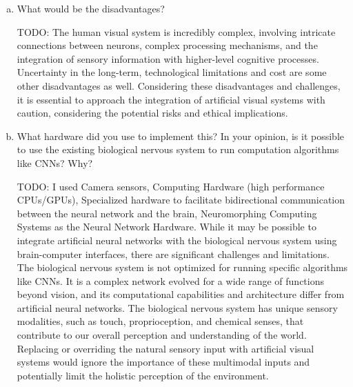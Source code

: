 \documentclass[letterpaper,11pt]{article}
\begin{document}
\begin{enumerate}[a)]
\item What would be the disadvantages?

\begin{tcolorbox}
TODO: The human visual system is incredibly complex, involving intricate connections between neurons, complex processing mechanisms, and the integration of sensory information with higher-level cognitive processes. Uncertainty in the long-term, technological limitations and cost are some other disadvantages as well. Considering these disadvantages and challenges, it is essential to approach the integration of artificial visual systems with caution, considering the potential risks and ethical implications.
\end{tcolorbox}

\item What hardware did you use to implement this? In your opinion, is it possible to use the existing biological nervous system to run computation algorithms like CNNs? Why?

\begin{tcolorbox}
TODO: I used Camera sensors, Computing Hardware (high performance CPUs/GPUs), Specialized hardware to facilitate bidirectional communication between the neural network and the brain, Neuromorphing Computing Systems as the Neural Network Hardware.
While it may be possible to integrate artificial neural networks with the biological nervous system using brain-computer interfaces, there are significant challenges and limitations. The biological nervous system is not optimized for running specific algorithms like CNNs. It is a complex network evolved for a wide range of functions beyond vision, and its computational capabilities and architecture differ from artificial neural networks. The biological nervous system has unique sensory modalities, such as touch, proprioception, and chemical senses, that contribute to our overall perception and understanding of the world. Replacing or overriding the natural sensory input with artificial visual systems would ignore the importance of these multimodal inputs and potentially limit the holistic perception of the environment.
\end{tcolorbox}
    
\end{enumerate}
\end{document}
